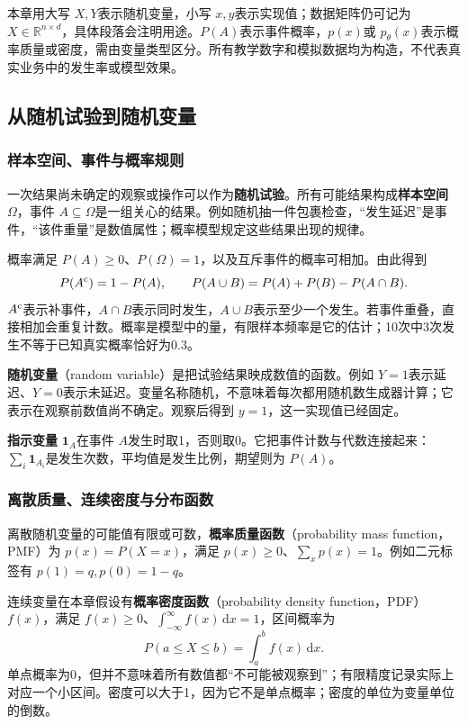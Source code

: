 \documentclass[UTF8,fontset=none,zihao=-4,a4paper]{ctexart}
\newcommand{\term}[1]{\textbf{#1}}
\numberwithin{equation}{section}
\numberwithin{figure}{section}
\begin{document}
本章用大写 $X,Y$表示随机变量，小写 $x,y$表示实现值；数据矩阵仍可记为 $X\in\mathbb R^{n\times d}$，具体段落会注明用途。$P(A)$表示事件概率，$p(x)$或 $p_\theta(x)$表示概率质量或密度，需由变量类型区分。所有教学数字和模拟数据均为构造，不代表真实业务中的发生率或模型效果。

\subsection{从随机试验到随机变量}
\subsubsection{样本空间、事件与概率规则}
一次结果尚未确定的观察或操作可以作为\term{随机试验}。所有可能结果构成\term{样本空间} $\Omega$，事件 $A\subseteq\Omega$是一组关心的结果。例如随机抽一件包裹检查，“发生延迟”是事件，“该件重量”是数值属性；概率模型规定这些结果出现的规律。

概率满足 $P(A)\ge0$、$P(\Omega)=1$，以及互斥事件的概率可相加。由此得到
\[
 P(A^{\rm c})=1-P(A),\qquad
 P(A\cup B)=P(A)+P(B)-P(A\cap B).
\]
$A^{\rm c}$表示补事件，$A\cap B$表示同时发生，$A\cup B$表示至少一个发生。若事件重叠，直接相加会重复计数。概率是模型中的量，有限样本频率是它的估计；10次中3次发生不等于已知真实概率恰好为0.3。

\term{随机变量}（random variable）是把试验结果映成数值的函数。例如 $Y=1$表示延迟、$Y=0$表示未延迟。变量名称随机，不意味着每次都用随机数生成器计算；它表示在观察前数值尚不确定。观察后得到 $y=1$，这一实现值已经固定。

\term{指示变量} $\mathbf1_A$在事件 $A$发生时取1，否则取0。它把事件计数与代数连接起来：$\sum_i\mathbf1_{A_i}$是发生次数，平均值是发生比例，期望则为 $P(A)$。

\subsubsection{离散质量、连续密度与分布函数}
离散随机变量的可能值有限或可数，\term{概率质量函数}（probability mass function，PMF）为 $p(x)=P(X=x)$，满足 $p(x)\ge0$、$\sum_xp(x)=1$。例如二元标签有 $p(1)=q,p(0)=1-q$。

连续变量在本章假设有\term{概率密度函数}（probability density function，PDF）$f(x)$，满足 $f(x)\ge0$、$\int_{-\infty}^{\infty}f(x)\,\mathrm dx=1$，区间概率为
\[
 P(a\le X\le b)=\int_a^b f(x)\,\mathrm dx.
\]
单点概率为0，但并不意味着所有数值都“不可能被观察到”；有限精度记录实际上对应一个小区间。密度可以大于1，因为它不是单点概率；密度的单位为变量单位的倒数。
\end{document}
